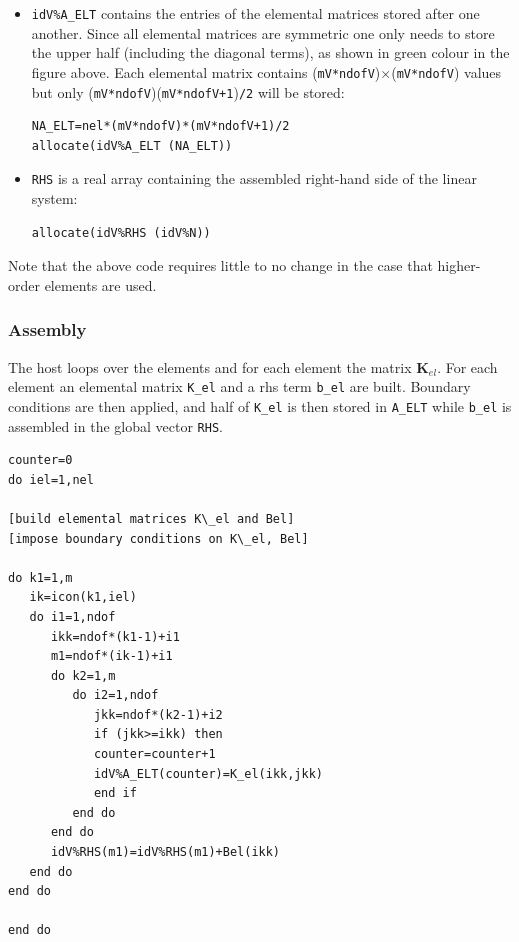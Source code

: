 \begin{itemize}
\item {\tt idV\%A\_ELT} contains the entries of the elemental matrices stored after one another. Since  
all elemental matrices are symmetric one only needs to store the upper half (including the diagonal terms), 
as shown in green colour in the figure above.
Each elemental matrix contains ({\tt mV*ndofV})$\times$({\tt mV*ndofV}) values but only 
({\tt mV*ndofV})({\tt mV*ndofV+1}){\tt /2} will be stored:
\begin{verbatim}
NA_ELT=nel*(mV*ndofV)*(mV*ndofV+1)/2 
allocate(idV%A_ELT (NA_ELT))
\end{verbatim}

\item {\tt RHS} is a real array containing the assembled right-hand side of the linear system:
\begin{verbatim}
allocate(idV%RHS (idV%N))
\end{verbatim}

\end{itemize}

Note that the above code requires little to no change in the case that higher-order elements are used. 

\subsubsection{Assembly}

The host loops over the elements and for each element
the matrix ${\bm K}_{el}$. 
 For each element an elemental matrix {\tt K\_el} and a rhs term {\tt b\_el}
are built. Boundary conditions are then applied, 
and half of {\tt K\_el} is then stored in {\tt A\_ELT} while 
{\tt b\_el} is assembled in the global vector {\tt RHS}.

\begin{verbatim}
counter=0
do iel=1,nel

[build elemental matrices K\_el and Bel]
[impose boundary conditions on K\_el, Bel]

do k1=1,m
   ik=icon(k1,iel)
   do i1=1,ndof
      ikk=ndof*(k1-1)+i1
      m1=ndof*(ik-1)+i1
      do k2=1,m
         do i2=1,ndof
            jkk=ndof*(k2-1)+i2
            if (jkk>=ikk) then
            counter=counter+1
            idV%A_ELT(counter)=K_el(ikk,jkk)
            end if
         end do
      end do
      idV%RHS(m1)=idV%RHS(m1)+Bel(ikk)
   end do
end do

end do
\end{verbatim}




